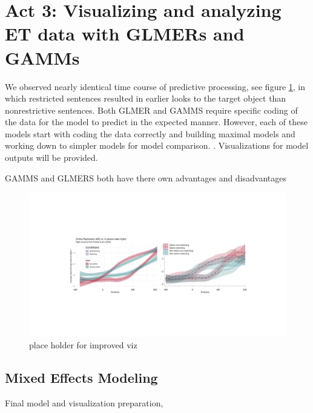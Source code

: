 \section{Act 3: Visualizing and analyzing ET data with GLMERs and GAMMs}




We observed nearly identical time course of predictive processing, see figure \ref{fig:comparitive}, in which restricted sentences resulted in earlier looks to the target object than nonrestrictive sentences. Both GLMER and GAMMS require specific coding of the data for the model to predict in the expected manner.  However, each of these models start with coding the data correctly and building maximal models and working down to simpler models for model comparison. \parencite{max model}. Visualizations for model outputs will be provided.




GAMMS and GLMERS both have there own advantages and disadvantages \parencite{Ito_Knoeferle_2022}
\begin{figure}[h]
    \centering
    \includegraphics[width=\textwidth]{figures/comparitive.jpeg}
    \caption{place holder for improved viz}
    \label{fig:comparitive}
\end{figure}

\subsection{Mixed Effects Modeling}
Final model and visualization preparation, 


